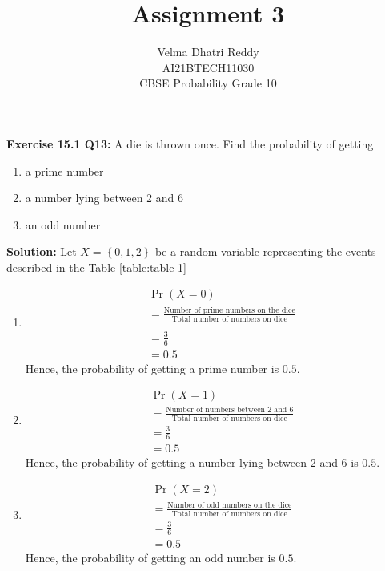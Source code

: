\documentclass[journal,11pt,twocolumn]{IEEEtran}
\title{Assignment 3}
\author{Velma Dhatri Reddy \\ \normalsize AI21BTECH11030 \\ \vspace*{10pt} \Large CBSE Probability Grade 10}
\providecommand{\pr}[1]{\ensuremath{\Pr\left(#1\right)}}
\providecommand{\cbrak}[1]{\ensuremath{\left\{#1\right\}}}
\begin{document}
\maketitle
\textbf{Exercise 15.1 Q13:}
A die is thrown once. Find the probability of getting	\begin{enumerate}[label=(\roman*)]
		\item a prime number
		\item a number lying between 2 and 6
		\item an odd number
\end{enumerate}

\textbf{Solution:} Let $X=\cbrak{0,1,2}$ be a random variable representing the events described in the Table	\eqref{table:table-1}

\begin{table}[ht!]
	
	\vspace*{5pt}
\caption{}
	\label{table:table-1}
\end{table}
\begin{enumerate}[label=(\roman*)]
	\item
\begin{align}
    &\pr{X=0} \\
    &= \frac{\text{Number of prime numbers on the dice}}{\text{Total number of numbers on dice}}\\ \\
    &=\frac{3}{6}\\
    &=0.5
\end{align}
Hence, the probability of getting a prime number is $0.5$.
	\item 
\begin{align}
    &\pr{X=1} \\
    &= \frac{\text{Number of numbers between 2 and 6}}{\text{Total number of numbers on dice}}\\
    &=\frac{3}{6}\\
    &=0.5
\end{align}
Hence, the probability of getting a number lying between 2 and 6 is $0.5$.
	\item 
\begin{align}
    &\pr{X=2} \\
    &= \frac{\text{Number of odd numbers on the dice}}{\text{Total number of numbers on dice}}\\
    &=\frac{3}{6}\\
    &=0.5
\end{align}
Hence, the probability of getting an odd number is $0.5$.
\end{enumerate}
\end{document}

